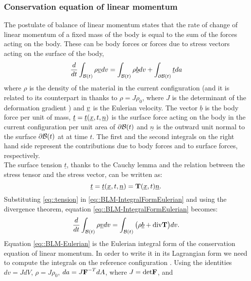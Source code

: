 \subsubsection{Conservation equation of linear momentum}
\label{sct-Conservation} The postulate of balance of linear momentum
states that the rate of change of linear momentum of a fixed mass of
the body is equal to the sum of the forces acting on the body. These
can be body forces or forces due to stress vectors acting on the
surface of the body,
\begin{equation}
  \frac{d}{dt}\int_{\mathcal{B}(t)}\rho\underline{v} dv =
  \int_{\mathcal{B}(t)}\rho\underline{b}
  dv+\int_{\partial\mathcal{B}(t)}\underline{t}da
  \label{eq::BLM-IntegralFormEulerian}
\end{equation}
where $\rho$ is the density of the material in the
current configuration (and it is related to its counterpart in \RefCon
thanks to $\rho=J\rho_0$, where $J$ is the determinant of the deformation
gradient \F) and $\underline{v}$ is the Eulerian velocity. The
vector $\underline{b}$ is the body force per unit of mass,
$\underline{t}=\underline{t}(\underline{x},t, \underline{n})$ is the surface
force acting on the body in the current configuration per unit area of
$\partial\mathcal{B}(t)$ and $\underline{n}$ is the outward unit normal to
the surface $\partial\mathcal{B}(t)$ at \npos at time $t$. The first and the
second integrals on the right hand side represent the contributions
due to body forces and to surface forces, respectively.\\ The surface
tension $\underline{t}$, thanks to the Cauchy lemma and the relation
between the stress tensor and the stress vector, can be written as:
\begin{equation}
  \underline{t}=\underline{t}(\underline{x},t,
  \underline{n})=\textbf{T}(\underline{x},t)\underline{n}.
  \label{eq::tension}
\end{equation}
Substituting \eqref{eq::tension} in
\eqref{eq::BLM-IntegralFormEulerian} and using the divergence theorem,
equation \eqref{eq::BLM-IntegralFormEulerian} becomes:
\begin{equation}
  \frac{d}{dt}\int_{\mathcal{B}(t)}\rho\underline{v} dv =
  \int_{\mathcal{B}(t)}\big(\rho\underline{b} +\text{div}\textbf{T} \big)dv.
  \label{eq::BLM-Eulerian}
\end{equation}
Equation \eqref{eq::BLM-Eulerian} is the Eulerian
integral form of the conservation equation of linear momentum. In
order to write it in its Lagrangian form we need to compute the
integrals on the reference configuration \RefCon. Using the identities
$dv=JdV$, $\rho=J\rho_0$, $da=J\textbf{F}^{-T}dA$, where $J=\text{det}\textbf{F}$, and
